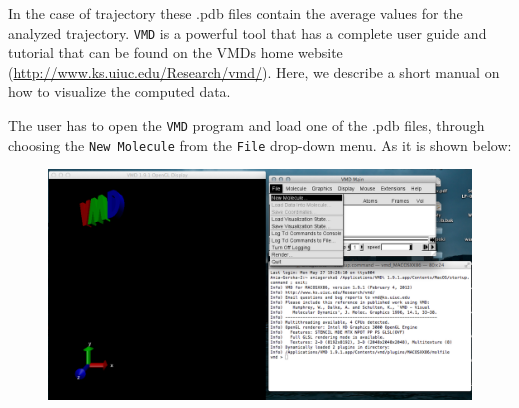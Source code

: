 \documentclass[12pt]{article}
\begin{document}
In the case of trajectory these .pdb files contain the average values for the analyzed trajectory. \texttt{VMD} is a powerful tool that has a complete user guide and tutorial that can be found on the VMDs home website (\url{http://www.ks.uiuc.edu/Research/vmd/}). Here, we describe a short manual on how to visualize the computed data.

The user has to open the \texttt{VMD} program and load one of the .pdb files, through choosing the \texttt{New Molecule} from the \texttt{File} drop-down menu. As it is shown below:

\begin{figure}[h!]
\centering
\includegraphics[scale=0.4]{./pictures/vmd1.png}
\end{figure}
\end{document}
